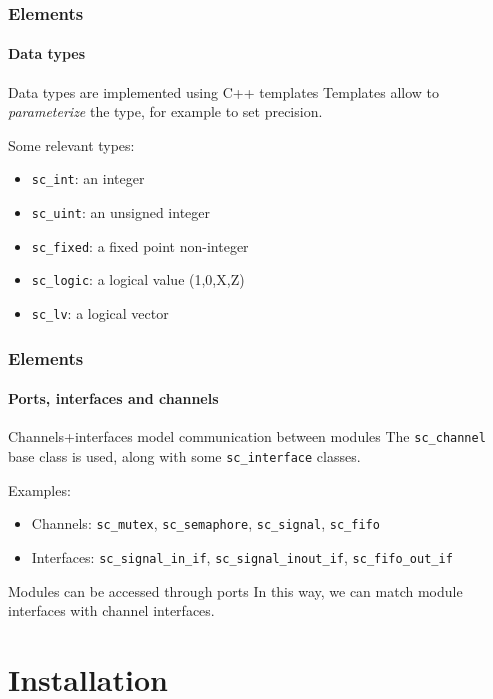 \begin{frame}
\frametitle{Elements}
\framesubtitle{Data types}

\begin{block}{Data types are implemented using C++ templates}
Templates allow to {\em parameterize} the type, for example to set precision.
\end{block}
\pause
\begin{block}{Some relevant types:}
\begin{itemize}
\item \texttt{sc\_int}: an integer
\item \texttt{sc\_uint}: an unsigned integer
\item \texttt{sc\_fixed}: a fixed point non-integer
\item \texttt{sc\_logic}: a logical value (1,0,X,Z)
\item \texttt{sc\_lv}: a logical vector
\end{itemize}
\end{block}

\end{frame}

\begin{frame}
\frametitle{Elements}
\framesubtitle{Ports, interfaces and channels}

\begin{block}{Channels+interfaces model communication between modules}
The \texttt{sc\_channel} base class is used, along with some \texttt{sc\_interface} classes.
\end{block}
\pause
\begin{block}{Examples:}
\begin{itemize}
\item Channels: \texttt{sc\_mutex}, \texttt{sc\_semaphore}, \texttt{sc\_signal}, \texttt{sc\_fifo}
\item Interfaces: \texttt{sc\_signal\_in\_if}, \texttt{sc\_signal\_inout\_if}, \texttt{sc\_fifo\_out\_if}
\end{itemize}
\end{block}
\pause
\begin{block}{Modules can be accessed through ports}
In this way, we can match module interfaces with channel interfaces.
\end{block}

\end{frame}

\section{Installation}

